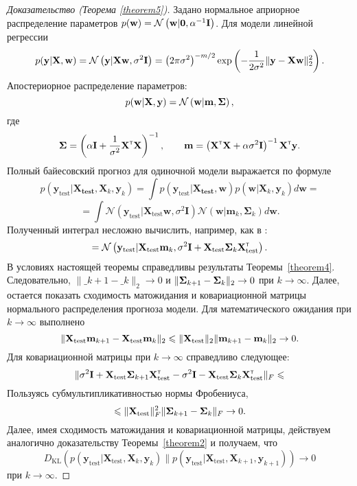 \begin{proof}[Доказательство (Теорема \ref{theorem5})]
    Задано нормальное априорное распределение параметров $p(\mathbf{w}) = \mathcal{N}\left( \mathbf{w} | \mathbf{0}, \alpha^{-1} \mathbf{I} \right)$. Для модели линейной регрессии 
    \[ p(\mathbf{y} | \mathbf{X}, \mathbf{w}) = \mathcal{N}\left( \mathbf{y} | \mathbf{X} \mathbf{w}, \sigma^2 \mathbf{I} \right) = \left( 2\pi\sigma^2 \right)^{-m/2} \exp\left( -\dfrac{1}{2\sigma^2} \| \mathbf{y} - \mathbf{X} \mathbf{w} \|_2^2 \right). \]
    Апостериорное распределение параметров:
    \[ p(\mathbf{w} | \mathbf{X}, \mathbf{y}) = \mathcal{N}\left( \mathbf{w} | \mathbf{m}, \boldsymbol{\Sigma} \right), \]
    где
    \[ \boldsymbol{\Sigma} = \left( \alpha \mathbf{I} + \dfrac{1}{\sigma^2} \mathbf{X}^{\text{\tiny\sffamily\upshape\mdseries T}} \mathbf{X} \right)^{-1}, \qquad \mathbf{m} = \left( \mathbf{X}^{\text{\tiny\sffamily\upshape\mdseries T}} \mathbf{X} + \alpha \sigma^2 \mathbf{I} \right)^{-1} \mathbf{X}^{\text{\tiny\sffamily\upshape\mdseries T}} \mathbf{y}. \]
    Полный байесовский прогноз для одиночной модели выражается по формуле
    \[ p(\mathbf{y}_{\text{test}}|\mathbf{X_{\text{test}}}, \mathbf{X}_k, \mathbf{y}_k) = \int p(\mathbf{y}_{\text{test}}|\mathbf{X_{\text{test}}}, \mathbf{w}) p(\mathbf{w}|\mathbf{X}_k, \mathbf{y}_k) d\mathbf{w} = \]
    \[ = \int \mathcal{N}\left( \mathbf{y}_{\text{test}} | \mathbf{X}_{\text{test}}\mathbf{w}, \sigma^2 \mathbf{I} \right) \mathcal{N}\left( \mathbf{w} | \mathbf{m}_k, \boldsymbol{\Sigma}_k \right) d\mathbf{w}. \]
    Полученный интеграл несложно вычислить, например, как в \cite{pml1Book}:
    \[ = \mathcal{N}\left( \mathbf{y}_{\text{test}} | \mathbf{X}_{\text{test}} \mathbf{m}_k, \sigma^2 \mathbf{I} + \mathbf{X}_{\text{test}} \boldsymbol{\Sigma}_k \mathbf{X}_{\text{test}}^{\text{\tiny\sffamily\upshape\mdseries T}} \right). \]
    В условиях настоящей теоремы справедливы результаты Теоремы~\ref{theorem4}. Следовательно, $\| \bm_{k+1} - \bm_k \|_2 \to 0$ и $\| \boldsymbol{\Sigma}_{k+1} - \boldsymbol{\Sigma}_k \|_2 \to 0$ при $k \to \infty$. Далее, остается показать сходимость матожидания и ковариационной матрицы нормального распределения прогноза модели. Для математического ожидания при $k \to \infty$ выполнено
    \[ \| \mathbf{X}_{\text{test}} \mathbf{m}_{k+1} - \mathbf{X}_{\text{test}} \mathbf{m}_{k} \|_2 \leqslant \| \mathbf{X}_{\text{test}} \|_2 \| \mathbf{m}_{k+1} - \mathbf{m}_k \|_2 \to 0. \]
    Для ковариационной матрицы при $k \to \infty$ справедливо следующее:
    \[ \| \sigma^2 \mathbf{I} + \mathbf{X}_{\text{test}} \boldsymbol{\Sigma}_{k+1} \mathbf{X}_{\text{test}}^{\text{\tiny\sffamily\upshape\mdseries T}} - \sigma^2 \mathbf{I} - \mathbf{X}_{\text{test}} \boldsymbol{\Sigma}_{k} \mathbf{X}_{\text{test}}^{\text{\tiny\sffamily\upshape\mdseries T}} \|_F \leqslant \]
    Пользуясь субмультипликативностью нормы Фробениуса,
    \[ \leqslant \| \mathbf{X}_{\text{test}} \|_F^2 \| \boldsymbol{\Sigma}_{k+1} - \boldsymbol{\Sigma}_{k} \|_F \to 0. \]
    Далее, имея сходимость матожидания и ковариационной матрицы, действуем аналогично доказательству Теоремы~\ref{theorem2} и получаем, что
    \[ D_{\mathrm{KL}}\left(p(\mathbf{y}_{\mathrm{test}}|\mathbf{X_{\mathrm{test}}}, \mathbf{X}_k, \mathbf{y}_k) \| p(\mathbf{y}_{\mathrm{test}}|\mathbf{X_{\mathrm{test}}}, \mathbf{X}_{k+1}, \mathbf{y}_{k+1})\right) \to 0  \]
    при $k \to \infty$.
\end{proof}